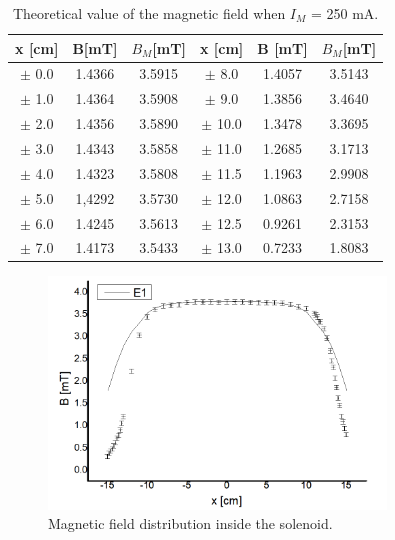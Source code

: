 \documentclass[a4paper,12pt]{article}
\begin{document}
\begin{table}[H]
\begin{center}
\begin{tabular}{|c|c|c||c|c|c|}
\hline
x {[}cm{]} & B{[}mT{]} & $B_M${[}mT{]} & x {[}cm{]} & B {[}mT{]} & $B_M${[}mT{]} \\ \hline
$\pm$ 0.0 & 1.4366 & 3.5915 & $\pm$ 8.0 & 1.4057 & 3.5143 \\ \hline
$\pm$ 1.0 & 1.4364 & 3.5908 & $\pm$ 9.0 & 1.3856 & 3.4640\\ \hline
$\pm$ 2.0 & 1.4356 & 3.5890 & $\pm$ 10.0 & 1.3478 & 3.3695\\ \hline
$\pm$ 3.0 & 1.4343 & 3.5858 & $\pm$ 11.0 & 1.2685 & 3.1713\\ \hline
$\pm$ 4.0 & 1.4323 & 3.5808 & $\pm$ 11.5 & 1.1963 & 2.9908\\ \hline
$\pm$ 5.0 & 1,4292 & 3.5730 & $\pm$ 12.0 & 1.0863 & 2.7158\\ \hline
$\pm$ 6.0 & 1.4245 & 3.5613 & $\pm$ 12.5 & 0.9261 & 2.3153\\ \hline
$\pm$ 7.0 & 1.4173 & 3.5433 & $\pm$ 13.0 & 0.7233 & 1.8083\\ \hline
\end{tabular}
\caption{Theoretical value of the magnetic field when $I_M$ = 250 mA.}
\end{center}
\end{table}


\begin{figure}[H] 
    \centering
    \includegraphics[width=0.8\textwidth]{p3} 
    \caption{Magnetic field distribution inside the solenoid.} 
\end{figure}

\newpage
\end{document}
